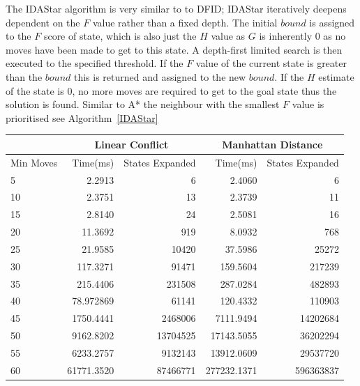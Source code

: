 \documentclass[final]{cmpreport}
\begin{document}
The IDAStar algorithm is very similar to to DFID; IDAStar iteratively deepens dependent on the $F$ value rather than a fixed depth. The initial $bound$ is assigned to the $F$ score of state, which is also just the $H$ value as $G$ is inherently 0 as no moves have been made to get to this state. A depth-first limited search is then executed to the specified threshold. If the $F$ value of the current state is greater than the $bound$ this is returned and assigned to the new $bound$. If the $H$ estimate of the state is 0, no more moves are required to get to the goal state thus the solution is found. Similar to A* the neighbour with the smallest $F$ value is prioritised see Algorithm~\ref{IDAStar}


\begin{center}

	\begin{tabular}{|l|r|r|r|r|} \cline{2-5}
		
		\multicolumn{1}{c}{} & \multicolumn{2}{|c|}{Linear Conflict} &
		\multicolumn{2}{|c|}{Manhattan Distance} \\ \hline
		Min Moves & Time(ms) & States Expanded & Time(ms) & States Expanded \\	\hline \hline
		5  & 2.2913 & 6                        & 2.4060       &          6            \\
		10 & 2.3751  & 13                      & 2.3739       &         11            \\
		15 & 2.8140 & 24                       & 2.5081          &      16            \\
		20 & 11.3692 & 919                     & 8.0932        &        768           \\
		25&  21.9585  & 10420                  & 37.5986        &       25272         \\
		30& 117.3271 & 91471                   & 159.5604        &      217239        \\
		35  & 215.4406 & 231508                & 287.0284        &      482893        \\
		40& 78.972869 & 61141                  & 120.4332          &    110903        \\
		45 & 1750.4441 & 2468006               & 7111.9494        &     14202684      \\
		50& 9162.8202 & 13704525               & 17143.5055         &   36202294       \\
		55 & 6233.2757 & 9132143               & 13912.0609        &    29537720       \\
		60 & 61771.3520 & 87466771             & 277232.1371      &     596363837      \\
		\hline
		
	\end{tabular}
	
\end{center}
\end{document}
